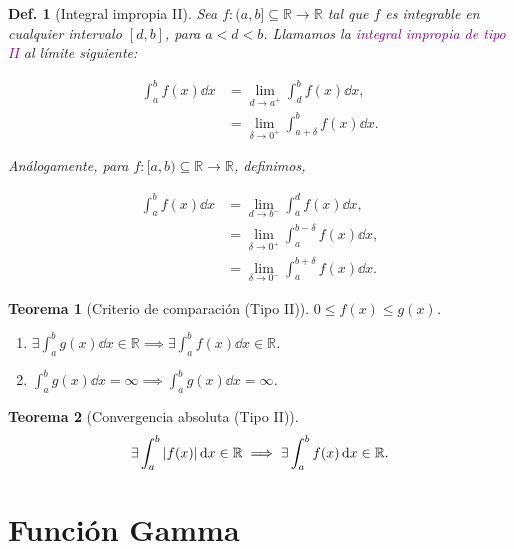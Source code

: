 \documentclass{article}
\theoremstyle{definicion}
\newtheorem{definicion}{Def.}
\theoremstyle{definition}             %
\theoremstyle{definition}             %
\theoremstyle{definition}
\theoremstyle{definition}
\theoremstyle{observacion}
\theoremstyle{definition}
\theoremstyle{plain}
\newtheorem{theorem}{Teorema}
\theoremstyle{definition}
\theoremstyle{afirmacion}
\theoremstyle{definition}
\begin{document}
    \begin{definicion}[Integral impropia II]
        Sea \(f\colon (a,b] \subseteq \mathbb{R}\to\mathbb{R}\) tal que \(f\) es integrable en cualquier intervalo \([d,b]\), para \(a < d < b\). Llamamos la \textcolor{purple}{integral impropia de tipo II} al límite siguiente:

        \begin{align*}
            \int_{a}^{b} f(x) \dd{x} &= \lim_{d\to a^{+}}\int_{d}^{b}f(x)\dd{x},\\
            &= \lim_{\delta \to 0^{+}}\int_{a + \delta}^{b}f(x)\dd{x}.
        \end{align*}

        Análogamente, para \(f \colon [a,b)\subseteq\mathbb{R}\to\mathbb{R}\), definimos, 

        \begin{align*}
            \int_{a}^{b} f(x) \dd{x} &= \lim_{d\to b^{-}}\int_{a}^{d}f(x)\dd{x},\\
            &= \lim_{\delta \to 0^{+}}\int_{a}^{b - \delta}f(x)\dd{x},\\
            &= \lim_{\delta \to 0^{-}}\int_{a}^{b + \delta}f(x)\dd{x}.
        \end{align*}
    \end{definicion}

    \begin{theorem}[Criterio de comparación (Tipo II)]
        \(0 \leq f(x) \leq g(x)\).

        \begin{enumerate}
            \item \(\exists \int_{a}^{b}g(x)\dd{x}\in\mathbb{R} \implies \exists \int_{a}^{b}f(x)\dd{x}\in\mathbb{R}\).
            \item \(\int_{a}^{b}g(x)\dd{x} = \infty \implies \int_{a}^{b}g(x)\dd{x} = \infty\).
        \end{enumerate}
    \end{theorem}

    \begin{theorem}[Convergencia absoluta (Tipo II)]
        \vphantom{flfjdaslkjfaskdjf}
        \begin{equation*}
            \exists \int_{a}^{b}\abs{f(x)}\dd{x}\in\mathbb{R} \implies \exists \int_{a}^{b}f(x)\dd{x}\in\mathbb{R}.
        \end{equation*}
    \end{theorem}

    \section{Función Gamma}
\end{document}
